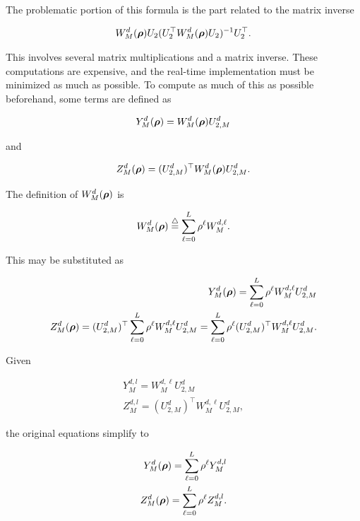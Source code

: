 The problematic portion of this formula is the part related to the matrix inverse

\begin{align}
    W_M^{d}(\boldsymbol{\rho}) U_2 (U_2^\top W_M^{d}(\boldsymbol{\rho}) U_2 )^{-1} U_2^\top.
\end{align}

This involves several matrix multiplications and a matrix inverse.
These computations are expensive, and the real-time implementation must be minimized as much as possible. 
To compute as much of this as possible beforehand, some terms are defined as

\begin{align}
    Y^d_M(\boldsymbol{\rho}) = W_M^{d}(\boldsymbol{\rho}) U^d_{2,M}
\end{align}

and

\begin{align}
    Z^d_M(\boldsymbol{\rho}) = (U^{d}_{2,M})^\top W_M^{d}(\boldsymbol{\rho}) U^d_{2,M}.
\end{align}

The definition of $W_M^{d}(\boldsymbol{\rho})$ is

\begin{align}
    W_M^{d}(\boldsymbol{\rho}) \stackrel{\triangle}{=} \sum_{\ell=0}^L \rho^\ell W_M^{d,\ell}.
\end{align}

This may be substituted as

\begin{align}
    Y^d_M(\boldsymbol{\rho}) = \sum_{\ell=0}^L \rho^\ell W_M^{d,\ell} U^d_{2,M}\\
    Z^d_M(\boldsymbol{\rho}) = (U^{d}_{2,M})^\top \sum_{\ell=0}^L \rho^\ell W_M^{d,\ell} U^d_{2,M} = \sum_{\ell=0}^L \rho^\ell (U^{d}_{2,M})^\top  W_M^{d,\ell} U^d_{2,M}.
\end{align}

Given

\begin{align}
    Y^{d,l}_M = W_M^{d,\ell} U^d_{2,M}\\
    Z^{d,l}_M = (U^{d}_{2,M})^\top  W_M^{d,\ell} U^d_{2,M},
\end{align}

the original equations simplify to

\begin{align}
    Y^d_M(\boldsymbol{\rho}) = \sum_{\ell=0}^L \rho^\ell Y^{d,l}_M\\
    Z^d_M(\boldsymbol{\rho}) = \sum_{\ell=0}^L \rho^\ell Z^{d,l}_M.
\end{align}

